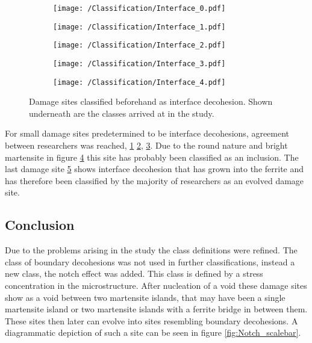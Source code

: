 \begin{figure}[H]
\begin{subfigure}{.2\textwidth}
\centering
  \texttt{[image: /Classification/Interface\_0.pdf]}
  \caption{}
  \label{fig:ID1}
\end{subfigure}%
\begin{subfigure}{.2\textwidth}
\centering
  \texttt{[image: /Classification/Interface\_1.pdf]}
  \caption{}
  \label{fig:ID2}
\end{subfigure}%
\centering
\begin{subfigure}{.2\textwidth}
\centering
  \texttt{[image: /Classification/Interface\_2.pdf]}
  \caption{}
  \label{fig:ID3}
\end{subfigure}%
\begin{subfigure}{.2\textwidth}
\centering
  \texttt{[image: /Classification/Interface\_3.pdf]}
  \caption{}
  \label{fig:ID4}
\end{subfigure}%
\begin{subfigure}{.2\textwidth}
\centering
  \texttt{[image: /Classification/Interface\_4.pdf]}
  \caption{}
  \label{fig:ID5}
\end{subfigure}%
\caption{Damage sites classified beforehand as interface decohesion. Shown underneath are the classes arrived at in the study.}
\label{fig:classes}
\end{figure}

For small damage sites predetermined to be interface decohesions, agreement between researchers was reached, \ref{fig:ID1} \ref{fig:ID2}, \ref{fig:ID3}. Due to the round nature and bright martensite in figure \ref{fig:ID4} this site has probably been classified as an inclusion. The last damage site \ref{fig:ID5} shows interface decohesion that has grown into the ferrite and has therefore been classified by the majority of researchers as an evolved damage site. 

\subsection{Conclusion}
Due to the problems arising in the study the class definitions were refined. The class of boundary decohesions was not used in further classifications, instead a new class, the notch effect was added. This class is defined by a stress concentration in the microstructure. After nucleation of a void these damage sites show as a void between two martensite islands, that may have been a single martensite island or two martensite islands with a ferrite bridge in between them. These sites then later can evolve into sites resembling boundary decohesions. A diagrammatic depiction of such a site can be seen in figure \ref{fig:Notch_scalebar}. \\

